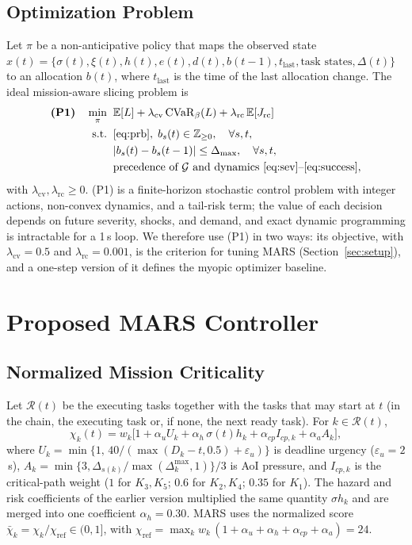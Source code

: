 \documentclass[conference]{IEEEtran}
\begin{document}
\subsection{Optimization Problem}
Let $\pi$ be a non-anticipative policy that maps the observed state $x(t)=\{\sigma(t),\xi(t),h(t),e(t),d(t),b(t-1),t_{\mathrm{last}},\text{task states},\Delta(t)\}$ to an allocation $b(t)$, where $t_{\mathrm{last}}$ is the time of the last allocation change. The ideal mission-aware slicing problem is
\begin{equation}
\begin{aligned}
\textbf{(P1)}\quad \min_{\pi}\;\; & \mathbb{E}[L] + \lambda_{\mathrm{cv}}\,\mathrm{CVaR}_{\beta}(L) + \lambda_{\mathrm{rc}}\,\mathbb{E}[J_{\mathrm{rc}}]\\
\text{s.t.}\;\; & \eqref{eq:prb},\; b_s(t)\in\mathbb{Z}_{\ge0}, \quad \forall s,t,\\
& |b_s(t)-b_s(t-1)|\le\Delta_{\max}, \quad \forall s,t,\\
& \text{precedence of }\mathcal{G}\text{ and dynamics }\eqref{eq:sev}\text{--}\eqref{eq:success},
\end{aligned}
\label{eq:p1}
\end{equation}
with $\lambda_{\mathrm{cv}},\lambda_{\mathrm{rc}}\ge0$. (P1) is a finite-horizon stochastic control problem with integer actions, non-convex dynamics, and a tail-risk term; the value of each decision depends on future severity, shocks, and demand, and exact dynamic programming is intractable for a 1\,s loop. We therefore use (P1) in two ways: its objective, with $\lambda_{\mathrm{cv}}=0.5$ and $\lambda_{\mathrm{rc}}=0.001$, is the criterion for tuning MARS (Section~\ref{sec:setup}), and a one-step version of it defines the myopic optimizer baseline.

\section{Proposed MARS Controller}\label{sec:mars}
\subsection{Normalized Mission Criticality}
Let $\mathcal{R}(t)$ be the executing tasks together with the tasks that may start at $t$ (in the chain, the executing task or, if none, the next ready task). For $k\in\mathcal{R}(t)$,
\begin{equation}
\chi_k(t)=w_k\big[1+\alpha_u U_k+\alpha_h\,\sigma(t) h_k+\alpha_{cp}I_{cp,k}+\alpha_a A_k\big],
\label{eq:criticality}
\end{equation}
where $U_k=\min\{1,\,40/(\max(D_k-t,0.5)+\varepsilon_u)\}$ is deadline urgency ($\varepsilon_u=2$\,s), $A_k=\min\{3,\Delta_{s(k)}/\max(\Delta_k^{\max},1)\}/3$ is AoI pressure, and $I_{cp,k}$ is the critical-path weight ($1$ for $K_3,K_5$; $0.6$ for $K_2,K_4$; $0.35$ for $K_1$). The hazard and risk coefficients of the earlier version multiplied the same quantity $\sigma h_k$ and are merged into one coefficient $\alpha_h=0.30$. MARS uses the normalized score $\bar\chi_k=\chi_k/\chi_{\mathrm{ref}}\in(0,1]$, with $\chi_{\mathrm{ref}}=\max_k w_k\,(1+\alpha_u+\alpha_h+\alpha_{cp}+\alpha_a)=24$.
\end{document}
